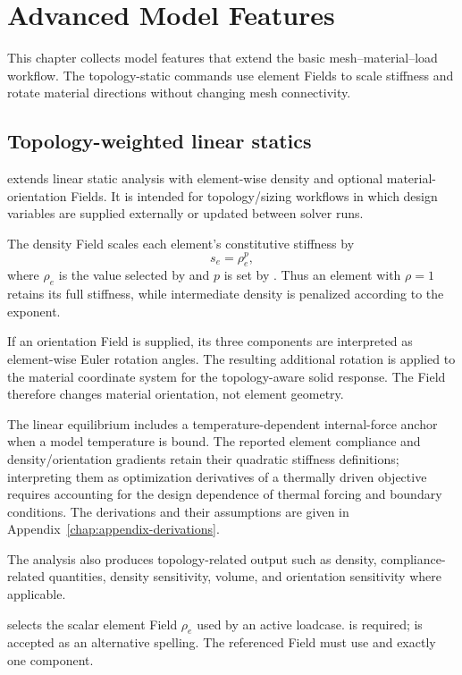 \chapter{Advanced Model Features}
\label{chap:advanced-features}

This chapter collects model features that extend the basic mesh--material--load workflow. The topology-static commands use element Fields to scale stiffness and rotate material directions without changing mesh connectivity.

\section{Topology-weighted linear statics}

 extends linear static analysis with element-wise density and optional material-orientation Fields. It is intended for topology/sizing workflows in which design variables are supplied externally or updated between solver runs.

The density Field scales each element's constitutive stiffness by
\[
s_e=\rho_e^p,
\]
where \(\rho_e\) is the value selected by  and \(p\) is set by . Thus an element with \(\rho=1\) retains its full stiffness, while intermediate density is penalized according to the exponent.

If an orientation Field is supplied, its three components are interpreted as element-wise Euler rotation angles. The resulting additional rotation is applied to the material coordinate system for the topology-aware solid response. The Field therefore changes material orientation, not element geometry.

The linear equilibrium includes a temperature-dependent internal-force anchor when a model temperature is bound. The reported element compliance and density/orientation gradients retain their quadratic stiffness definitions; interpreting them as optimization derivatives of a thermally driven objective requires accounting for the design dependence of thermal forcing and boundary conditions. The derivations and their assumptions are given in Appendix~\ref{chap:appendix-derivations}.

The analysis also produces topology-related output such as density, compliance-related quantities, density sensitivity, volume, and orientation sensitivity where applicable.


 selects the scalar element Field \(\rho_e\) used by an active  loadcase.  is required;  is accepted as an alternative spelling. The referenced Field must use  and exactly one component.

